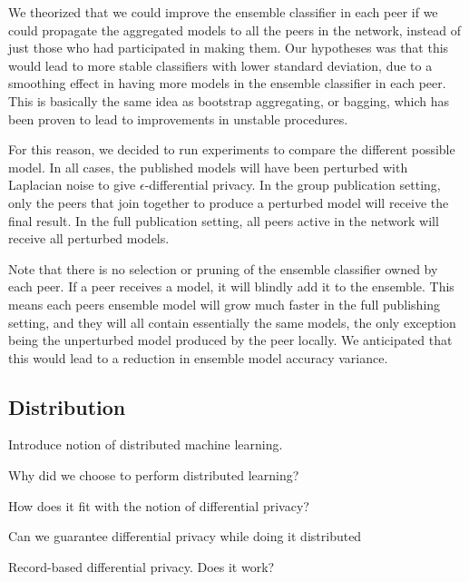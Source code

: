We theorized that we could improve the ensemble classifier in each peer if we could propagate the aggregated models to all the peers in the network, instead of just those who had participated in making them. Our hypotheses was that this would lead to more stable classifiers with lower standard deviation, due to a smoothing effect in having more models in the ensemble classifier in each peer. This is basically the same idea as bootstrap aggregating, or bagging, which has been proven to lead to improvements in unstable procedures\cite{breiman1996bagging}. 

For this reason, we decided to run experiments to compare the different possible model. In all cases, the published models will have been perturbed with Laplacian noise to give $\epsilon$-differential privacy. In the group publication setting, only the peers that join together to produce a perturbed model will receive the final result. In the full publication setting, all peers active in the network will receive all perturbed models. 

Note that there is no selection or pruning of the ensemble classifier owned by each peer. If a peer receives a model, it will blindly add it to the ensemble. This means each peers ensemble model will grow much faster in the full publishing setting, and they will all contain essentially the same models, the only exception being the unperturbed model produced by the peer locally. We anticipated that this would lead to a reduction in ensemble model accuracy variance.


\subsection{Distribution}
Introduce notion of distributed machine learning. 

Why did we choose to perform distributed learning?

How does it fit with the notion of differential privacy?

Can we guarantee differential privacy while doing it distributed

Record-based differential privacy. Does it work?







